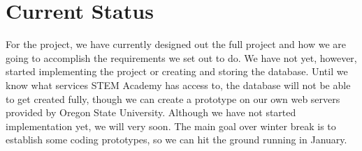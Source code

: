 \documentclass[letterpaper,10pt,serif, draftclsnofoot,onecolumn, compsoc, titlepage]{IEEEtran}
\begin{document}
\section{Current Status}
For the project, we have currently designed out the full project and how we are going to accomplish the requirements we set out to do.
We have not yet, however, started implementing the project or creating and storing the database.
Until we know what services STEM Academy has access to, the database will not be able to get created fully, though we can create a prototype on our own web servers provided by Oregon State University.
Although we have not started implementation yet, we will very soon. The main goal over winter break is to establish some coding prototypes, so we can hit the ground running in January. 
\end{document}
